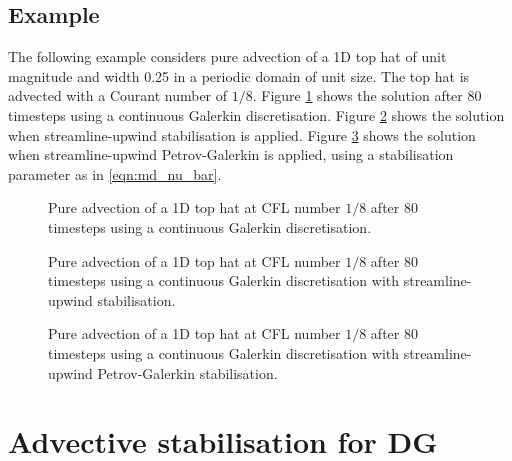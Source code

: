 \subsection{Example}

The following example considers pure advection of a 1D top hat of unit magnitude
and width 0.25 in a periodic domain of unit size. The top hat is advected with a
Courant number of $1 / 8$. Figure \ref{fig:top_hat_cg} shows the solution after
80 timesteps using a continuous Galerkin discretisation. Figure \ref{fig:top_hat_su}
shows the solution when streamline-upwind stabilisation is applied.
Figure \ref{fig:top_hat_supg} shows the solution when streamline-upwind
Petrov-Galerkin is applied, using a stabilisation parameter as in \eqref{eqn:md_nu_bar}.

\begin{figure}[ht]
  \centering
  \caption{Pure advection of a 1D top hat at CFL number $1 / 8$ after 80 timesteps
           using a continuous Galerkin discretisation.}
  \label{fig:top_hat_cg}
\end{figure}

\begin{figure}[ht]
  \centering
  \caption{Pure advection of a 1D top hat at CFL number $1 / 8$ after 80 timesteps
           using a continuous Galerkin discretisation with streamline-upwind
           stabilisation.}
  \label{fig:top_hat_su}
\end{figure}

\begin{figure}[ht]
  \centering
  \caption{Pure advection of a 1D top hat at CFL number $1 / 8$ after 80 timesteps
           using a continuous Galerkin discretisation with streamline-upwind
           Petrov-Galerkin stabilisation.}
  \label{fig:top_hat_supg}
\end{figure}

\section{Advective stabilisation for DG}

